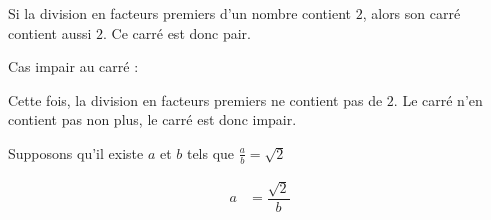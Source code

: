 Si la division en facteurs premiers d'un nombre contient $2$, alors son carré contient aussi $2$. Ce carré est donc pair.
\newline

\par Cas impair au carré :

Cette fois, la division en facteurs premiers ne contient pas de $2$. Le carré n'en contient pas non plus, le carré est donc impair.

Supposons qu'il existe $a$ et $b$ tels que $\frac a b = \sqrt{2}$

\begin{equation*}
	\begin{split}
		a &= \dfrac {\sqrt{2}} b
	\end{split}
\end{equation*}